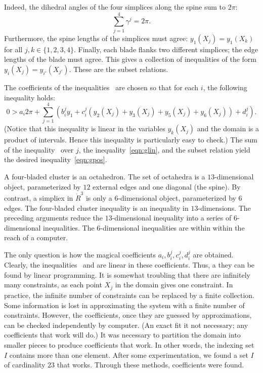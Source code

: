   Indeed, the dihedral angles of the four simplices along the spine sum to $2\pi$:
$$
\sum_{j=1}^4 \gamma^j = 2\pi.
$$
Furthermore, the spine lengths of the simplices must agree: $y_1(X_j) = y_1(X_k)$ for all $j,k\in\{1,2,3,4\}$.
Finally, each blade flanks two different simplices; the edge lengths of the blade must agree.  This gives
a collection of inequalities of the form $y_i(X_j) = y_{i'}(X_{j'})$.  These are the subset relations.

The coefficients of the inequalities~
are chosen so that for each $i$, the following inequality holds:
\begin{equation}\label{eqn:glin}
0 > a_i 2\pi + \sum_{j=1}^4 (b_i^j y_1 +  c_i^j (y_2(X_j)+y_3(X_j)+y_5(X_j)+y_6(X_j)) + d_i^j).
\end{equation}
(Notice that this inequality is linear in the variables $y_k(X_j)$ and the domain is a product of intervals.  Hence this inequality is particularly easy to check.)
The sum of the inequality~ over $j$, the inequality~\ref{eqn:glin}, and the subset relation yield the desired inequality~\ref{eqn:gpos}.

A four-bladed cluster is an octahedron.  The set of octahedra is a $13$-dimensional object, parameterized by $12$ external edges and one diagonal (the spine).   By contrast, a simpliex in $\ring{R}^3$ is only a $6$-dimensional object, parameterized by $6$ edges.
The four-bladed cluster inequality is an inequality in $13$-dimensions.
The preceding arguments reduce the $13$-dimensional inequality into a series of $6$-dimensional inequalities.   The $6$-dimensional inequalities are within within the reach of  a computer.

The only question is how the magical coefficients $a_i,b_i^j,c_i^j,d_i^j$ are obtained.  Clearly, the inequalities~ and  are linear in these coefficients.  Thus, a they can be found by linear programming.   It is somewhat troubling that there are infinitely many constraints, as each point $X_j$ in the domain gives one constraint.  In practice, the infinite number of constraints can be replaced by a finite collection.  Some information is lost in approximating the system with a finite number of constraints.  However, the coefficients, once they are guessed by approximations, can be checked independently by computer.  (An exact fit it not necessary; any coefficients that work will do.)  
It was necessary to partition the domain into smaller pieces to produce coefficients that work.  In other words, the indexing set $I$ contains more than one element.   After some experimentation, we found a set $I$ of cardinality $23$ that works.
Through these methods, coefficients were found.


